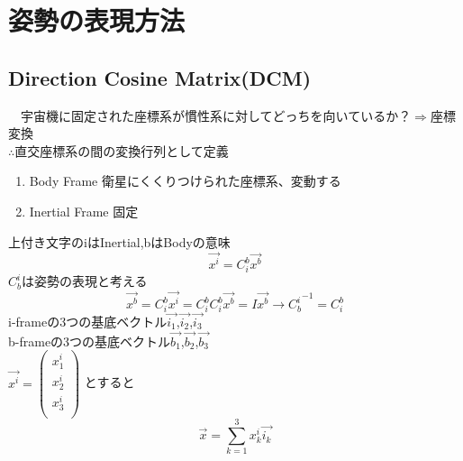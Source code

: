 \documentclass[class=article, crop=false, preview=false, dvipdfmx, a4paper]{standalone}
\begin{document}
\section{姿勢の表現方法}

\subsection{Direction Cosine Matrix(DCM)}
　宇宙機に固定された座標系が慣性系に対してどっちを向いているか？$\Rightarrow$座標変換\\
 $\therefore$直交座標系の間の変換行列として定義
 \begin{enumerate}
 \item Body Frame 衛星にくくりつけられた座標系、変動する 
 \item Inertial Frame 固定
 \end{enumerate}
 上付き文字のiはInertial,bはBodyの意味
 \[ \vec{x^i}=C^b_i\vec{x^b} \]
 $C^i_b$は姿勢の表現と考える
 \[ \vec{x^b} = C^b_i \vec{x^i} = C^b_i C^b_i \vec{x^b} = I \vec{x^b}
 	\rightarrow {C^i_b}^{-1} = C^b_i \]
 i-frameの3つの基底ベクトル$\vec{i_1}$,$\vec{i_2}$,$\vec{i_3}$\\
 b-frameの3つの基底ベクトル$\vec{b_1}$,$\vec{b_2}$,$\vec{b_3}$\\
 $\vec{x^i}=
 	\begin{pmatrix}
    	x^i_1\\
        x^i_2\\
        x^i_3\\
    \end{pmatrix}$
とすると
\begin{equation}
\vec{x} = \sum_{k=1}^{3} x^i_k \vec{i_k}
\end{equation}
\end{document}

